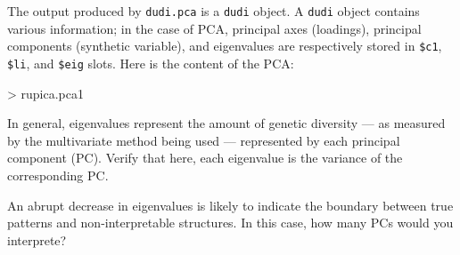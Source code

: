 \documentclass{article}
\begin{document}
\noindent The output produced by \texttt{dudi.pca} is a \texttt{dudi} object.
A \texttt{dudi} object contains various information; in the case of
PCA, principal axes (loadings), principal components (synthetic variable), and eigenvalues are respectively
stored in \texttt{\$c1}, \texttt{\$li}, and \texttt{\$eig} slots.
Here is the content of the PCA:
\begin{Schunk}
\begin{Sinput}
> rupica.pca1
\end{Sinput}
\end{Schunk}

In general, eigenvalues represent the amount of genetic diversity --- as measured by
the multivariate method being used --- represented by each principal component (PC).
Verify that here, each eigenvalue is the variance of the corresponding PC.

An abrupt decrease in eigenvalues is likely to indicate the boundary
between true patterns and non-interpretable structures.
In this case, how many PCs would you interprete?
\\
\end{document}
